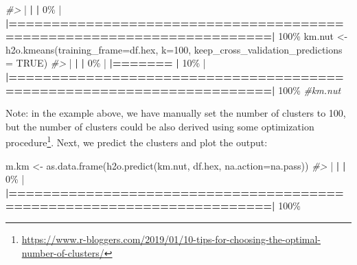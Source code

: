 \documentclass[
  graybox,natbib,nospthms]{svmono}
\newenvironment{Shaded}{\begin{snugshade}}{\end{snugshade}}
\newcommand{\AttributeTok}[1]{\textcolor[rgb]{0.61,0.61,0.61}{#1}}
\newcommand{\CommentTok}[1]{\textcolor[rgb]{0.37,0.37,0.37}{\textit{#1}}}
\newcommand{\ConstantTok}[1]{\textcolor[rgb]{0,0,0}{#1}}
\newcommand{\DecValTok}[1]{\textcolor[rgb]{0.06,0.06,0.06}{#1}}
\newcommand{\ErrorTok}[1]{\textcolor[rgb]{0.14,0.14,0.14}{\textbf{#1}}}
\newcommand{\FunctionTok}[1]{\textcolor[rgb]{0,0,0}{#1}}
\newcommand{\NormalTok}[1]{#1}
\newcommand{\OtherTok}[1]{\textcolor[rgb]{0.37,0.37,0.37}{#1}}
\newcommand{\SpecialCharTok}[1]{\textcolor[rgb]{0,0,0}{#1}}
\renewcommand{\href}[2]{#2 (\url{#1})}
\renewcommand{\href}[2]{#2\footnote{\url{#1}}}
\begin{document}
\begin{Shaded}
\begin{Highlighting}[]
\CommentTok{\#\textgreater{} }
  \SpecialCharTok{|}                                                                            
  \ErrorTok{|}                                                                      \ErrorTok{|}   \DecValTok{0}\NormalTok{\%}
  \SpecialCharTok{|}                                                                            
  \ErrorTok{|======================================================================|} \DecValTok{100}\NormalTok{\%}
\NormalTok{km.nut }\OtherTok{\textless{}{-}} \FunctionTok{h2o.kmeans}\NormalTok{(}\AttributeTok{training\_frame=}\NormalTok{df.hex, }\AttributeTok{k=}\DecValTok{100}\NormalTok{, }\AttributeTok{keep\_cross\_validation\_predictions =} \ConstantTok{TRUE}\NormalTok{)}
\CommentTok{\#\textgreater{} }
  \SpecialCharTok{|}                                                                            
  \ErrorTok{|}                                                                      \ErrorTok{|}   \DecValTok{0}\NormalTok{\%}
  \SpecialCharTok{|}                                                                            
  \ErrorTok{|=======}                                                               \ErrorTok{|}  \DecValTok{10}\NormalTok{\%}
  \SpecialCharTok{|}                                                                            
  \ErrorTok{|======================================================================|} \DecValTok{100}\NormalTok{\%}
\CommentTok{\#km.nut}
\end{Highlighting}
\end{Shaded}

Note: in the example above, we have manually set the number of clusters to 100,
but the number of clusters could be also derived using \href{https://www.r-bloggers.com/2019/01/10-tips-for-choosing-the-optimal-number-of-clusters/}{some optimization procedure}.
Next, we predict the clusters and plot the output:

\begin{Shaded}
\begin{Highlighting}[]
\NormalTok{m.km }\OtherTok{\textless{}{-}} \FunctionTok{as.data.frame}\NormalTok{(}\FunctionTok{h2o.predict}\NormalTok{(km.nut, df.hex, }\AttributeTok{na.action=}\NormalTok{na.pass))}
\CommentTok{\#\textgreater{} }
  \SpecialCharTok{|}                                                                            
  \ErrorTok{|}                                                                      \ErrorTok{|}   \DecValTok{0}\NormalTok{\%}
  \SpecialCharTok{|}                                                                            
  \ErrorTok{|======================================================================|} \DecValTok{100}\NormalTok{\%}
\end{Highlighting}
\end{Shaded}
\end{document}
